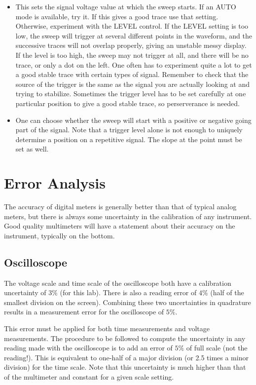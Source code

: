 \begin{enumerate}
\begin{itemize}
            \item {} This sets the signal voltage value at which the sweep starts. If an AUTO mode is available, try it. If this gives a good trace use that setting. Otherwise, experiment with the LEVEL control. If the LEVEL setting is too low, the sweep will trigger at several different points in the waveform, and the successive traces will not overlap properly, giving an unstable messy display. If the level is too high, the sweep may not trigger at all, and there will be no trace, or only a dot on the left. One often has to experiment quite a lot to get a good stable trace with certain types of signal. Remember to check that the source of the trigger is the same as the signal you are actually looking at and trying to stabilize. Sometimes the trigger level has to be set carefully at one particular position to give a good stable trace, so perserverance is needed.
            \item {} One can choose whether the sweep will start with a positive or negative going part of the signal. Note that a trigger level alone is not enough to uniquely determine a position on a repetitive signal. The slope at the point must be set as well.
        \end{itemize}
\end{enumerate}


\section{Error Analysis}


The accuracy of digital meters is generally better than that of typical analog meters, but there is always some uncertainty in the calibration of any instrument. Good quality multimeters will have a statement about their accuracy on the instrument, typically on the bottom.

\subsection{Oscilloscope}

The voltage scale and time scale of the oscilloscope both have a calibration uncertainty of $3\%$ (for this lab). There is also a reading error of $4\%$ (half of the smallest division on the screen). Combining these two uncertainties in quadrature results in a measurement error for the oscilloscope of $5\%$.

\noindent This error must be applied for both time measurements and voltage measurements. The procedure to be followed to compute the uncertainty in any reading made with the oscilloscope is to add an error of $5\%$ of full scale (not the reading!). This is equivalent to one-half of a major division (or 2.5 times a minor division) for the time scale. Note that this uncertainty is much higher than that of the multimeter and constant for a given scale setting.

